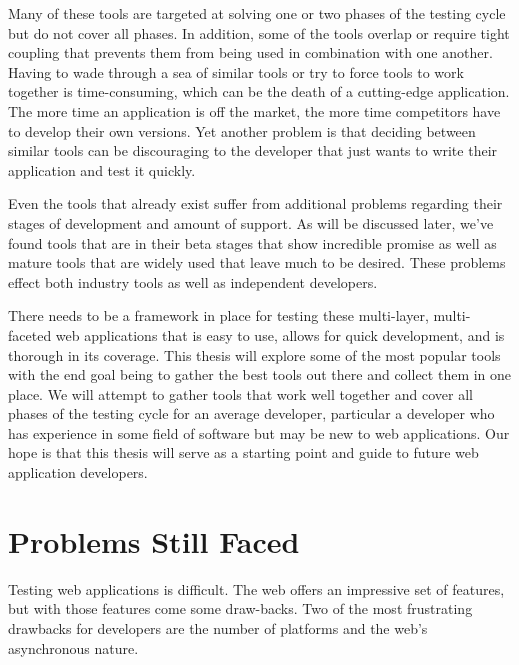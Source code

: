 \documentclass[12pt]{ucthesis}
\begin{document}
Many of these tools are targeted at solving one or two phases of the testing cycle but do not cover all phases. In addition, some of the tools overlap or require tight coupling that prevents them from being used in combination with one another. Having to wade through a sea of similar tools or try to force tools to work together is time-consuming, which can be the death of a cutting-edge application. The more time an application is off the market, the more time competitors have to develop their own versions. Yet another problem is that deciding between similar tools can be discouraging to the developer that just wants to write their application and test it quickly.

Even the tools that already exist suffer from additional problems regarding their stages of development and amount of support. As will be discussed later, we've found tools that are in their beta stages that show incredible promise as well as mature tools that are widely used that leave much to be desired. These problems effect both industry tools as well as independent developers.

There needs to be a framework in place for testing these multi-layer, multi-faceted web applications that is easy to use, allows for quick development, and is thorough in its coverage. This thesis will explore some of the most popular tools with the end goal being to gather the best tools out there and collect them in one place. We will attempt to gather tools that work well together and cover all phases of the testing cycle for an average developer, particular a developer who has experience in some field of software but may be new to web applications. Our hope is that this thesis will serve as a starting point and guide to future web application developers.

\section{Problems Still Faced}
Testing web applications is difficult. The web offers an impressive set of features, but with those features come some draw-backs. Two of the most frustrating drawbacks for developers are the number of platforms and the web's asynchronous nature.
\end{document}
